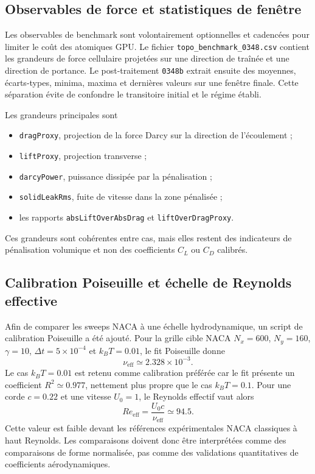 \documentclass[11pt,a4paper]{article}
\begin{document}
\subsection{Observables de force et statistiques de fenêtre}

Les observables de benchmark sont volontairement optionnelles et cadencées pour limiter le coût des atomiques GPU. Le fichier \texttt{topo\_benchmark\_0348.csv} contient les grandeurs de force cellulaire projetées sur une direction de traînée et une direction de portance. Le post-traitement \texttt{0348b} extrait ensuite des moyennes, écarts-types, minima, maxima et dernières valeurs sur une fenêtre finale. Cette séparation évite de confondre le transitoire initial et le régime établi.

Les grandeurs principales sont
\begin{itemize}[leftmargin=*]
  \item \texttt{dragProxy}, projection de la force Darcy sur la direction de l'écoulement ;
  \item \texttt{liftProxy}, projection transverse ;
  \item \texttt{darcyPower}, puissance dissipée par la pénalisation ;
  \item \texttt{solidLeakRms}, fuite de vitesse dans la zone pénalisée ;
  \item les rapports \texttt{absLiftOverAbsDrag} et \texttt{liftOverDragProxy}.
\end{itemize}
Ces grandeurs sont cohérentes entre cas, mais elles restent des indicateurs de pénalisation volumique et non des coefficients $C_L$ ou $C_D$ calibrés.

\subsection{Calibration Poiseuille et échelle de Reynolds effective}

Afin de comparer les sweeps NACA à une échelle hydrodynamique, un script de calibration Poiseuille a été ajouté. Pour la grille cible NACA $N_x=600$, $N_y=160$, $\gamma=10$, $\Delta t=5\times10^{-4}$ et $k_BT=0.01$, le fit Poiseuille donne
\begin{equation}
  \nu_{\mathrm{eff}}\simeq 2.328\times 10^{-3}.
\end{equation}
Le cas $k_BT=0.01$ est retenu comme calibration préférée car le fit présente un coefficient $R^2\simeq0.977$, nettement plus propre que le cas $k_BT=0.1$. Pour une corde $c=0.22$ et une vitesse $U_0=1$, le Reynolds effectif vaut alors
\begin{equation}
  Re_{\mathrm{eff}}=\frac{U_0 c}{\nu_{\mathrm{eff}}}\simeq94.5.
\end{equation}
Cette valeur est faible devant les références expérimentales NACA classiques à haut Reynolds. Les comparaisons doivent donc être interprétées comme des comparaisons de forme normalisée, pas comme des validations quantitatives de coefficients aérodynamiques.
\end{document}
